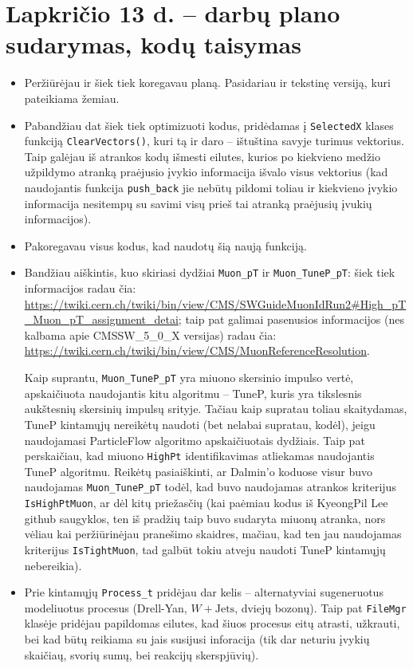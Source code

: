 \documentclass[a4paper, 12pt]{article}
\newcommand{\WJets}{W\! +\!\mathrm{Jets}}
\newcommand{\ttt}[1]{\texttt{#1}}
\begin{document}
\section{Lapkričio 13 d. -- darbų plano sudarymas, kodų taisymas}
\begin{itemize}
	\item Peržiūrėjau ir šiek tiek koregavau planą. Pasidariau ir tekstinę versiją, kuri pateikiama
	žemiau.
	\item Pabandžiau dat šiek tiek optimizuoti kodus, pridėdamas į \ttt{SelectedX} klases funkciją
	\ttt{ClearVectors()}, kuri tą ir daro -- ištuština savyje turimus vektorius. Taip galėjau iš
	atrankos kodų išmesti eilutes, kurios po kiekvieno medžio užpildymo atranką praėjusio įvykio
	informacija išvalo visus vektorius (kad naudojantis funkcija \ttt{push\_back} jie nebūtų pildomi
	toliau ir kiekvieno įvykio informacija nesitempų su savimi visų prieš tai atranką praėjusių
	įvukių informacijos).
	\item Pakoregavau visus kodus, kad naudotų šią naują funkciją.
	\item Bandžiau aiškintis, kuo skiriasi dydžiai \ttt{Muon\_pT} ir \ttt{Muon\_TuneP\_pT}: šiek tiek
	informacijos radau čia:
	\url{https://twiki.cern.ch/twiki/bin/view/CMS/SWGuideMuonIdRun2#High_pT_Muon_pT_assignment_detai};
	taip pat galimai pasenusios informacijos (nes kalbama apie CMSSW\_5\_0\_X versijas) radau čia:
	\url{https://twiki.cern.ch/twiki/bin/view/CMS/MuonReferenceResolution}.
	
	Kaip suprantu, \ttt{Muon\_TuneP\_pT} yra miuono skersinio impulso vertė, apskaičiuota naudojantis
	kitu algoritmu -- TuneP, kuris yra tikslesnis aukštesnių skersinių impulsų srityje. Tačiau kaip
	supratau toliau skaitydamas, TuneP kintamųjų nereikėtų naudoti (bet nelabai supratau, kodėl),
	jeigu naudojamasi ParticleFlow algoritmo apskaičiuotais dydžiais. Taip pat perskaičiau, kad
	miuono \ttt{HighPt} identifikavimas atliekamas naudojantis TuneP algoritmu. Reikėtų pasiaiškinti,
	ar Dalmin'o koduose visur buvo naudojamas \ttt{Muon\_TuneP\_pT} todėl, kad buvo naudojamas
	atrankos kriterijus \ttt{IsHighPtMuon},	ar dėl kitų priežasčių (kai paėmiau kodus iš KyeongPil
	Lee github saugyklos, ten iš pradžių taip	buvo sudaryta miuonų atranka, nors vėliau kai
	peržiūrinėjau pranešimo skaidres, mačiau, kad ten	jau naudojamas kriterijus \ttt{IsTightMuon}, 
	tad galbūt tokiu atveju naudoti TuneP kintamųjų	nebereikia).
	\item Prie kintamųjų \ttt{Process\_t} pridėjau dar kelis -- alternatyviai sugeneruotus modeliuotus
	procesus (Drell-Yan, $\WJets$, dviejų bozonų). Taip pat \ttt{FileMgr} klasėje pridėjau papildomas
	eilutes, kad šiuos procesus eitų atrasti, užkrauti, bei kad būtų reikiama su jais susijusi inforacija
	(tik dar neturiu įvykių skaičiaų, svorių sumų, bei reakcijų skerspjūvių).
\end{itemize}
\end{document}
